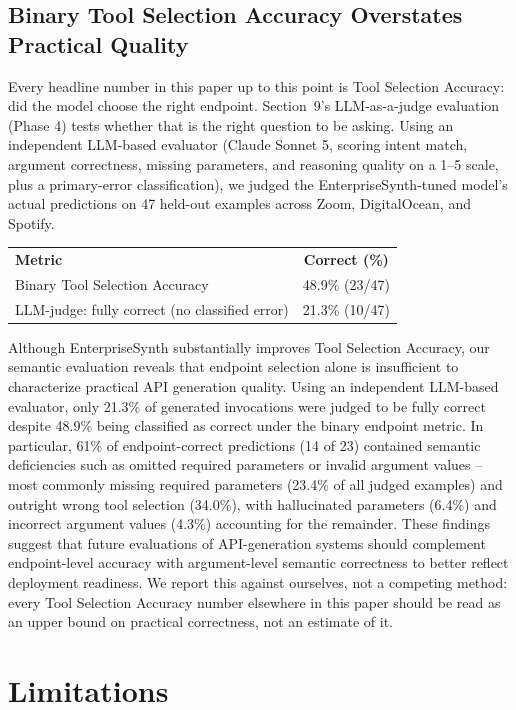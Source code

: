 \documentclass[11pt]{article}
\begin{document}
\subsection{Binary Tool Selection Accuracy Overstates Practical Quality}
Every headline number in this paper up to this point is Tool Selection Accuracy: did the model
choose the right endpoint. Section~9's LLM-as-a-judge evaluation (Phase 4) tests whether that is
the right question to be asking. Using an independent LLM-based evaluator (Claude Sonnet 5,
scoring intent match, argument correctness, missing parameters, and reasoning quality on a 1--5
scale, plus a primary-error classification), we judged the EnterpriseSynth-tuned model's actual
predictions on 47 held-out examples across Zoom, DigitalOcean, and Spotify.

\begin{center}
\small
\begin{tabular}{lc}
\textbf{Metric} & \textbf{Correct (\%)} \\
Binary Tool Selection Accuracy & 48.9\% (23/47) \\
LLM-judge: fully correct (no classified error) & 21.3\% (10/47) \\
\end{tabular}
\end{center}

Although EnterpriseSynth substantially improves Tool Selection Accuracy, our semantic evaluation
reveals that endpoint selection alone is insufficient to characterize practical API generation
quality. Using an independent LLM-based evaluator, only 21.3\% of generated invocations were
judged to be fully correct despite 48.9\% being classified as correct under the binary endpoint
metric. In particular, 61\% of endpoint-correct predictions (14 of 23) contained semantic
deficiencies such as omitted required parameters or invalid argument values -- most commonly
missing required parameters (23.4\% of all judged examples) and outright wrong tool selection
(34.0\%), with hallucinated parameters (6.4\%) and incorrect argument values (4.3\%) accounting
for the remainder. These findings suggest that future evaluations of API-generation systems
should complement endpoint-level accuracy with argument-level semantic correctness to better
reflect deployment readiness. We report this against ourselves, not a competing method: every
Tool Selection Accuracy number elsewhere in this paper should be read as an upper bound on
practical correctness, not an estimate of it.

\section{Limitations}
\end{document}
